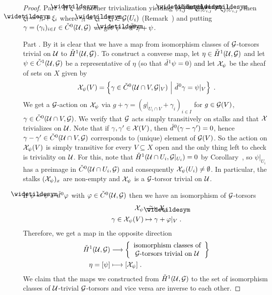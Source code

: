 \documentclass[a4paper,parskip=half,numbers=enddot, DIV=12]{scrreprt}
\begin{document}
\begin{proof}
	Part . If $\snake{\xi}$ is another trivialization yielding $\snake{\psi}_{i,j}=\snake{\xi}_i|_{U_{i,j}}-\snake{\xi}_j|_{U_{i,j}}$, then $\snake{\xi}_i=\gamma_i+\xi_i$ where $\gamma_i=\snake{\xi}_i-\xi_i\in\Gg(U_i)$ (Remark~) and putting $\gamma=(\gamma_i)_{i\in I}\in \check{C}^0(\mathcal{U},\mathcal{G})$ we get $\snake{\psi}=\hacek{d}^0\gamma+\psi$.
	
	Part . By  it is clear that we have a map from isomorphism classes of $\mathcal{G}$-torsors trivial on $\mathcal{U}$ to $\check{H}^1(\mathcal{U},\mathcal{G})$. To construct a converse map, let $\eta\in \check{H}^1(\mathcal{U},\mathcal{G})$ and let $\psi\in\check{C}^1(\mathcal{U},\mathcal{G})$ be a representative of $\eta$ (so that $\check{d}\hspace{0.06125em}^1\psi =0$) and let $\mathcal{X}_\psi$ be the sheaf of sets on $X$ given by
	\begin{align*}
		\mathcal{X}_\psi(V)=\left\{\gamma\in \check{C}^0(\mathcal{U}\cap V,\mathcal{G}|_V)\ \middle|\  \check{d}\hspace{0.06125em}^0\gamma=\psi|_V\right\}\;.
	\end{align*}
	We get a $\mathcal{G}$-action on $\mathcal{X}_\psi$ via $g+\gamma=(g|_{U_i\cap V}+\gamma_i)_{i\in I}$ for $g\in\mathcal{G}(V)$, $\gamma\in\check{C}^0(\mathcal{U}\cap V,\mathcal{G})$. We verify that $\mathcal{G}$ acts simply transitively on stalks and that $\mathcal{X}$ trivializes on $\mathcal{U}$. Note that if $\gamma,\gamma'\in \mathcal{X}(V)$, then $\check{d}\hspace{0.06125em}^0(\gamma-\gamma')=0$, hence $\gamma-\gamma'\in\check{C}^0(\mathcal{U}\cap V,\mathcal{G})$ corresponds to (unique) element of $\mathcal{G}(V)$. So the action on $\mathcal{X}_\psi(V)$ is simply transitive for every $V\subseteq X$ open and the only thing left to check is triviality on $\mathcal{U}$. For this, note that $\check{H}^1(\mathcal{U}\cap U_i,\mathcal{G}|_{U_i})=0$ by Corollary~, so $\psi|_{U_i}$ has a preimage in $\check{C}^0(\mathcal{U}\cap U_i,\mathcal{G})$ and consequently $\mathcal{X}_\psi(U_i)\neq\emptyset$. In particular, the stalks $(\mathcal{X}_\psi)_x$ are non-empty and $\mathcal{X}_\psi$ is a $\mathcal{G}$-torsor trivial on $\mathcal{U}$.
	
	If $\snake{\psi}=\psi+\hacek{d}^0\phi$ with $\varphi\in\check{C}^0(\mathcal{U},\mathcal{G})$ then we have an isomorphism of $\mathcal{G}$-torsors
	\begin{align*}
		\Xx_\psi&\isomorphism\Xx_{\snake{\psi}}\\
		\gamma\in\Xx_\psi(V) &\mapsto \gamma+\phi|_V\;.
	\end{align*}
	Therefore, we get a map in the opposite direction
	\begin{align*}
		\check{H}^1(\Uu,\Gg)&\morphism\left\{\begin{array}{c}
			\text{isomorphism classes of}\\
			\Gg\text{-torsors trivial on }\Uu
		\end{array}\right\}\\
		\eta=[\psi]&\longmapsto[\Xx_\psi]\;.
	\end{align*}
	We claim that the maps we constructed from $\check{H}^1(\mathcal{U},\mathcal{G})$ to the set of isomorphism classes of $\mathcal{U}$-trivial $\mathcal{G}$-torsors and vice versa are inverse to each other. 
	

\end{proof}
\end{document}
